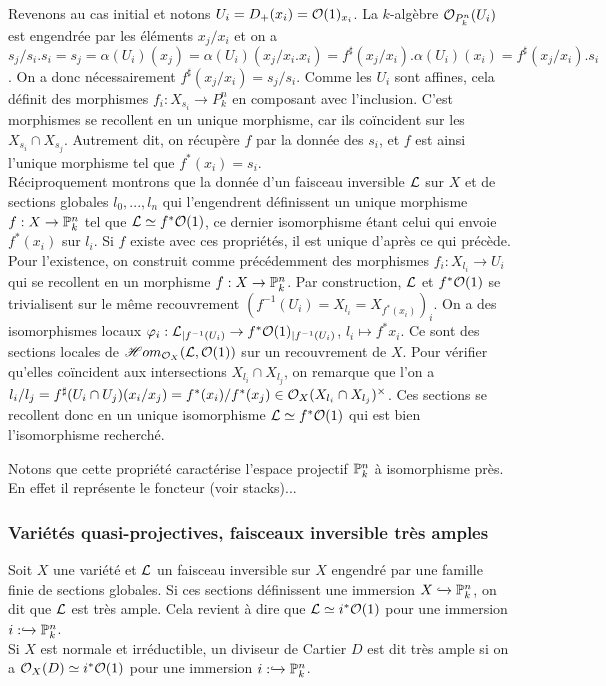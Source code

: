Revenons au cas initial et notons $U_i=D_+(x_i)=\mathcal{O}(1)_{x_i}$. La $k$-algèbre $\mathcal{O}_{P^n_k}(U_i)$ est engendrée par les éléments $x_j/x_i$ et on a $s_j/s_i.s_i=s_j=\alpha(U_i)(x_j)=\alpha(U_i)(x_j/x_i.x_i)=f^\sharp(x_j/x_i).\alpha(U_i)(x_i)=f^\sharp(x_j/x_i).s_i$. On a donc nécessairement $f^\sharp(x_j/x_i)=s_j/s_i$. Comme les $U_i$ sont affines, cela définit des morphismes $f_i:X_{s_i}\rightarrow P^n_k$ en composant avec l'inclusion. C'est morphismes se recollent en un unique morphisme, car ils coïncident sur les $X_{s_i}\cap X_{s_j}$. Autrement dit, on récupère $f$ par la donnée des $s_i$, et $f$ est ainsi l'unique morphisme tel que $f^*(x_i)=s_i$.\\
Réciproquement montrons que la donnée d'un faisceau inversible $\mathcal{L}$ sur $X$ et de sections globales $l_0,...,l_n$ qui l'engendrent définissent un unique morphisme $f:X\rightarrow \mathbb{P}^n_k$ tel que $\mathcal{L}\simeq f^*\mathcal{O}(1)$, ce dernier isomorphisme étant celui qui envoie $f^*(x_i)$ sur $l_i$. Si $f$ existe avec ces propriétés, il est unique d'après ce qui précède. Pour l'existence, on construit comme précédemment des morphismes $f_i:X_{l_i}\rightarrow U_i$ qui se recollent en un morphisme $f:X\rightarrow \mathbb{P}^n_k$. Par construction, $\mathcal{L}$ et $f^*\mathcal{O}(1)$ se trivialisent sur le même recouvrement $(f^{-1}(U_i)=X_{l_i}=X_{f^*(x_i)})_i$. On a des isomorphismes locaux $\varphi_i:\mathcal{L}_{|f^{-1}(U_i)}\rightarrow f^*\mathcal{O}(1)_{|f^{-1}(U_i)}$, $l_i\mapsto f^*x_i$. Ce sont des sections locales de $\mathscr{H}om_{\mathcal{O}_X}(\mathcal{L},\mathcal{O}(1))$ sur un recouvrement de $X$. Pour vérifier qu'elles coïncident aux intersections $X_{l_i}\cap X_{l_j}$, on remarque que l'on a $l_i/l_j=f^\sharp(U_i\cap U_j)(x_i/x_j)= f^*(x_i)/f^*(x_j)\in \mathcal{O}_X(X_{l_i}\cap X_{l_j})^\times$. Ces sections se recollent donc en un unique isomorphisme $\mathcal{L}\simeq f^*\mathcal{O}(1)$ qui est bien l'isomorphisme recherché.

Notons que cette propriété caractérise l'espace projectif $\mathbb{P}^n_k$ à isomorphisme près. En effet il représente le foncteur (voir stacks)...

\subsubsection{Variétés quasi-projectives, faisceaux inversible très amples}

\begin{defn}
Soit $X$ une variété et $\mathcal{L}$ un faisceau inversible sur $X$ engendré par une famille finie de sections globales. Si ces sections définissent une immersion $X\xhookrightarrow{}\mathbb{P}_k^n$, on dit que $\mathcal{L}$ est très ample. Cela revient à dire que $\mathcal{L}\simeq i^*\mathcal{O}(1)$  pour une immersion $i:\xhookrightarrow{}\mathbb{P}_k^n$.\\
Si $X$ est normale et irréductible, un diviseur de Cartier $D$ est dit très ample si on a $\mathcal{O}_X(D)\simeq i^*\mathcal{O}(1)$ pour une immersion $i:\xhookrightarrow{}\mathbb{P}_k^n$.
\end{defn}

